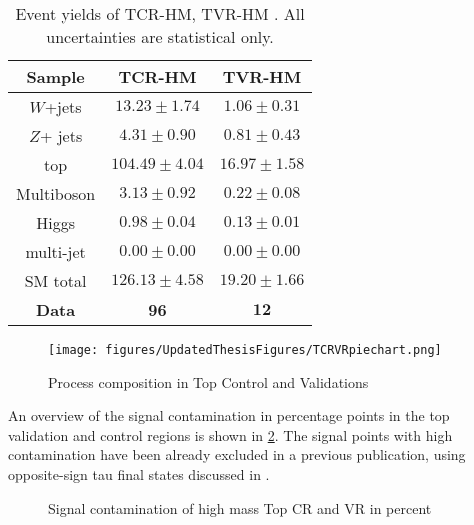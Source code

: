 \begin{table}[htpb!]
  \centering
\begin{tabular}{|c|c|c|}
\hline
\textbf{Sample} & \textbf{TCR-HM} & \textbf{TVR-HM}\tabularnewline
\hline
\hline
$W$+jets    &  $ 13.23 \pm 1.74 $ &  $ 1.06 \pm 0.31 $ \tabularnewline
\hline
$Z$+ jets   &  $ 4.31 \pm 0.90  $ & $ 0.81 \pm 0.43 $ \tabularnewline
\hline
top         &  $ 104.49 \pm 4.04 $ & $ 16.97 \pm 1.58 $         \tabularnewline
\hline
Multiboson  &  $ 3.13 \pm 0.92 $   & $ 0.22 \pm 0.08 $\tabularnewline
\hline
Higgs       &  $ 0.98 \pm 0.04 $   & $ 0.13 \pm 0.01 $      \tabularnewline
\hline
multi-jet & $0.00\pm0.00$ & $0.00\pm0.00$ \tabularnewline
\hline
\hline
SM total & $ 126.13 \pm 4.58 $ & $ 19.20 \pm 1.66  $ \tabularnewline
\hline
\textbf{Data} & \textbf{96} & $\mathbf{12}$\tabularnewline
\hline
\end{tabular}
\caption{Event yields of TCR-HM, TVR-HM \label{tab:SS:TopYields}. All uncertainties are statistical only.}
\end{table}

\begin{figure}[!htpb]
\centering
\texttt{[image: figures/UpdatedThesisFigures/TCRVRpiechart.png]}
  \caption{Process composition in Top Control and Validations \label{fig:SS:TopComp}}
\end{figure} %

An overview of the signal contamination in percentage points in the top validation and control regions is shown in \ref{fig:SS:SigContTop}. The signal points with high contamination have been already excluded in a previous publication, using opposite-sign tau final states discussed in \cite{DiTauC1N2_2018}.

\begin{figure}[!htpb]
\centering
  \caption{Signal contamination of high mass Top CR and VR in percent \label{fig:SS:SigContTop} }
\end{figure}%

